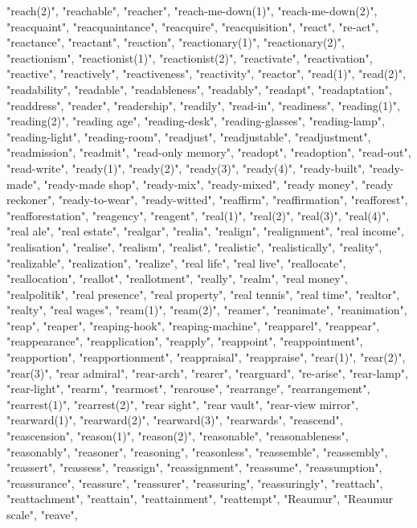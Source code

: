 "reach(2)",
"reachable",
"reacher",
"reach-me-down(1)",
"reach-me-down(2)",
"reacquaint",
"reacquaintance",
"reacquire",
"reacquisition",
"react",
"re-act",
"reactance",
"reactant",
"reaction",
"reactionary(1)",
"reactionary(2)",
"reactionism",
"reactionist(1)",
"reactionist(2)",
"reactivate",
"reactivation",
"reactive",
"reactively",
"reactiveness",
"reactivity",
"reactor",
"read(1)",
"read(2)",
"readability",
"readable",
"readableness",
"readably",
"readapt",
"readaptation",
"readdress",
"reader",
"readership",
"readily",
"read-in",
"readiness",
"reading(1)",
"reading(2)",
"reading age",
"reading-desk",
"reading-glasses",
"reading-lamp",
"reading-light",
"reading-room",
"readjust",
"readjustable",
"readjustment",
"readmission",
"readmit",
"read-only memory",
"readopt",
"readoption",
"read-out",
"read-write",
"ready(1)",
"ready(2)",
"ready(3)",
"ready(4)",
"ready-built",
"ready-made",
"ready-made shop",
"ready-mix",
"ready-mixed",
"ready money",
"ready reckoner",
"ready-to-wear",
"ready-witted",
"reaffirm",
"reaffirmation",
"reafforest",
"reafforestation",
"reagency",
"reagent",
"real(1)",
"real(2)",
"real(3)",
"real(4)",
"real ale",
"real estate",
"realgar",
"realia",
"realign",
"realignment",
"real income",
"realisation",
"realise",
"realism",
"realist",
"realistic",
"realistically",
"reality",
"realizable",
"realization",
"realize",
"real life",
"real live",
"reallocate",
"reallocation",
"reallot",
"reallotment",
"really",
"realm",
"real money",
"realpolitik",
"real presence",
"real property",
"real tennis",
"real time",
"realtor",
"realty",
"real wages",
"ream(1)",
"ream(2)",
"reamer",
"reanimate",
"reanimation",
"reap",
"reaper",
"reaping-hook",
"reaping-machine",
"reapparel",
"reappear",
"reappearance",
"reapplication",
"reapply",
"reappoint",
"reappointment",
"reapportion",
"reapportionment",
"reappraisal",
"reappraise",
"rear(1)",
"rear(2)",
"rear(3)",
"rear admiral",
"rear-arch",
"rearer",
"rearguard",
"re-arise",
"rear-lamp",
"rear-light",
"rearm",
"rearmost",
"rearouse",
"rearrange",
"rearrangement",
"rearrest(1)",
"rearrest(2)",
"rear sight",
"rear vault",
"rear-view mirror",
"rearward(1)",
"rearward(2)",
"rearward(3)",
"rearwards",
"reascend",
"reascension",
"reason(1)",
"reason(2)",
"reasonable",
"reasonableness",
"reasonably",
"reasoner",
"reasoning",
"reasonless",
"reassemble",
"reassembly",
"reassert",
"reassess",
"reassign",
"reassignment",
"reassume",
"reassumption",
"reassurance",
"reassure",
"reassurer",
"reassuring",
"reassuringly",
"reattach",
"reattachment",
"reattain",
"reattainment",
"reattempt",
"Reaumur",
"Reaumur scale",
"reave",
